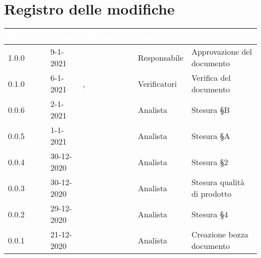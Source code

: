 \section*{Registro delle modifiche}
\setcounter{table}{-1}
{
\renewcommand{\arraystretch}{1.5}
\centering
\begin{longtable}{C{1.7cm} C{2.5cm} C{3.2cm} C{2.7cm} C{4.8cm}}
\textcolor{white}{\textbf{Versione}}&
\textcolor{white}{\textbf{Data}}&
\textcolor{white}{\textbf{Nominativo}}&
\textcolor{white}{\textbf{Ruolo}}&
\textcolor{white}{\textbf{Descrizione}}\\	
\endhead

1.0.0 & 9-1-2021 & \BM{} & Responsabile & Approvazione del documento \\
0.1.0 & 6-1-2021 & \SP{}, \BM{} & Verificatori & Verifica del documento \\
0.0.6 & 2-1-2021 & \RA{} & Analista & Stesura \S B \\
0.0.5 & 1-1-2021 & \PA{} & Analista & Stesura \S A \\
0.0.4 & 30-12-2020 & \PA{} & Analista & Stesura \S 2 \\
0.0.3 & 30-12-2020 & \ZM{} & Analista & Stesura qualità di prodotto\\
0.0.2 & 29-12-2020 & \RA{} & Analista & Stesura \S 4 \\
0.0.1 & 21-12-2020 & \ZM{} & Analista & Creazione bozza documento \\	
\end{longtable}
}
